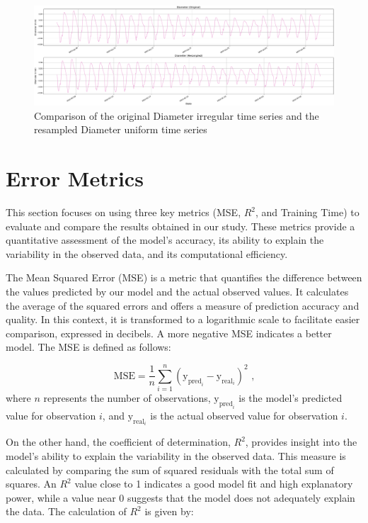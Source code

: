 \begin{figure}[htbp]
    \centering
    \includegraphics[width=15 cm]{5_ChapterDesign/figuras/5_Irregular/comparison_Diameter.pdf}
    \caption{Comparison of the original Diameter irregular time series and the resampled Diameter uniform time series}
    \label{comparison_Diameter}
\end{figure}

\section{Error Metrics}

This section focuses on using three key metrics (MSE, \( R^2 \), and Training Time) to evaluate and compare the results obtained in our study. These metrics provide a quantitative assessment of the model's accuracy, its ability to explain the variability in the observed data, and its computational efficiency.

The Mean Squared Error (MSE) is a metric that quantifies the difference between the values predicted by our model and the actual observed values. It calculates the average of the squared errors and offers a measure of prediction accuracy and quality. In this context, it is transformed to a logarithmic scale to facilitate easier comparison, expressed in decibels. A more negative MSE indicates a better model. The MSE is defined as follows:

\begin{equation}
    \text{MSE} = \frac{1}{n} \sum_{i=1}^{n} \left( \text{y}_{\text{pred}_i} - \text{y}_{\text{real}_i} \right)^2  \text{ ,}
\end{equation}where \( n \) represents the number of observations, \( \text{y}_{\text{pred}_i} \) is the model's predicted value for observation \( i \), and \( \text{y}_{\text{real}_i} \) is the actual observed value for observation \( i \).

On the other hand, the coefficient of determination, \( R^2 \), provides insight into the model's ability to explain the variability in the observed data. This measure is calculated by comparing the sum of squared residuals with the total sum of squares. An \( R^2 \) value close to 1 indicates a good model fit and high explanatory power, while a value near 0 suggests that the model does not adequately explain the data. The calculation of \( R^2 \) is given by:

